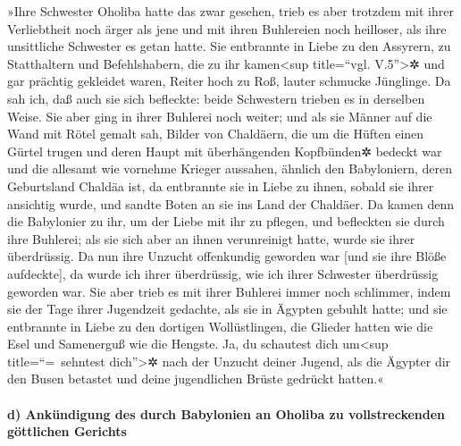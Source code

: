»Ihre Schwester Oholiba hatte das zwar gesehen, trieb es
aber trotzdem mit ihrer Verliebtheit noch ärger als jene und mit ihren
Buhlereien noch heilloser, als ihre unsittliche Schwester es getan
hatte. Sie entbrannte in Liebe zu den Assyrern, zu
Statthaltern und Befehlshabern, die zu ihr kamen\textless sup
title=``vgl. V.5''\textgreater✲ und gar prächtig gekleidet waren, Reiter
hoch zu Roß, lauter schmucke Jünglinge. Da sah ich, daß
auch sie sich befleckte: beide Schwestern trieben es in derselben Weise.
Sie aber ging in ihrer Buhlerei noch weiter; und als sie
Männer auf die Wand mit Rötel gemalt sah, Bilder von Chaldäern,
die um die Hüften einen Gürtel trugen und deren Haupt mit
überhängenden Kopfbünden✲ bedeckt war und die allesamt wie vornehme
Krieger aussahen, ähnlich den Babyloniern, deren Geburtsland Chaldäa
ist, da entbrannte sie in Liebe zu ihnen, sobald sie
ihrer ansichtig wurde, und sandte Boten an sie ins Land der Chaldäer.
Da kamen denn die Babylonier zu ihr, um der Liebe mit ihr
zu pflegen, und befleckten sie durch ihre Buhlerei; als sie sich aber an
ihnen verunreinigt hatte, wurde sie ihrer überdrüssig. Da
nun ihre Unzucht offenkundig geworden war {[}und sie ihre Blöße
aufdeckte{]}, da wurde ich ihrer überdrüssig, wie ich ihrer Schwester
überdrüssig geworden war. Sie aber trieb es mit ihrer
Buhlerei immer noch schlimmer, indem sie der Tage ihrer Jugendzeit
gedachte, als sie in Ägypten gebuhlt hatte; und sie
entbrannte in Liebe zu den dortigen Wollüstlingen, die Glieder hatten
wie die Esel und Samenerguß wie die Hengste. Ja, du
schautest dich um\textless sup title=``=~sehntest dich''\textgreater✲
nach der Unzucht deiner Jugend, als die Ägypter dir den Busen betastet
und deine jugendlichen Brüste gedrückt hatten.«

\hypertarget{d-ankuxfcndigung-des-durch-babylonien-an-oholiba-zu-vollstreckenden-guxf6ttlichen-gerichts}{%
\paragraph{d) Ankündigung des durch Babylonien an Oholiba zu
vollstreckenden göttlichen
Gerichts}\label{d-ankuxfcndigung-des-durch-babylonien-an-oholiba-zu-vollstreckenden-guxf6ttlichen-gerichts}}


